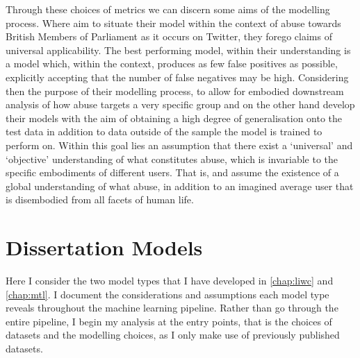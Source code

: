 Through these choices of metrics we can discern some aims of the modelling process.
Where \citet{Gorrell:2018} aim to situate their model within the context of abuse towards British Members of Parliament as it occurs on Twitter, they forego claims of universal applicability.
The best performing model, within their understanding is a model which, within the context, produces as few false positives as possible, explicitly accepting that the number of false negatives may be high.
Considering then the purpose of their modelling process,  to allow for embodied downstream analysis of how abuse targets a very specific group
\citet{Wulczyn:2016} and \citet{Kshirsagar:2018} on the other hand develop their models with the aim of obtaining a high degree of generalisation onto the test data in addition to data outside of the sample the model is trained to perform on.
Within this goal lies an assumption that there exist a `universal' and  `objective' understanding of what constitutes abuse, which is invariable to the specific embodiments of different users. 
That is, \citet{Wulczyn:2016} and \citet{Kshirsagar:2018} assume the existence of a global understanding of what  abuse, in addition to an imagined average user that is disembodied from all facets of human life.

\section{Dissertation Models}
Here I consider the two model types that I have developed in \autoref{chap:liwc} and \autoref{chap:mtl}.
I document the considerations and assumptions each model type reveals throughout the machine learning pipeline.
Rather than go through the entire pipeline, I begin my analysis at the entry points, that is the choices of datasets and the modelling choices, as I only make use of previously published datasets.

